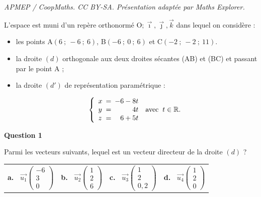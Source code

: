 \documentclass[10pt]{article}
\providecommand{\R}{\mathbb{R}}
\providecommand{\vect}[1]{\overrightarrow{#1}}
\providecommand{\Oijk}{\(\mathrm{O};\vec{\imath},\vec{\jmath},\vec{k}\)}
\begin{document}
\noindent\textit{APMEP / CoopMaths. CC BY-SA. Présentation adaptée par Maths Explorer.}\par\medskip
\medskip





L'espace est muni d'un repère orthonormé \Oijk{} dans lequel on considère :

\begin{itemize}
\item[$\bullet$~~] les points A$(6~;~-6~;~6)$, B$(-6~;~0~;~6)$ et C$(-2~;~-2~;~11)$.
\item[$\bullet$~~] la droite $(d)$ orthogonale aux deux droites sécantes (AB) et (BC) et passant par le point A ;
\item[$\bullet$~~] la droite $\left(d'\right)$ de représentation paramétrique :

\[\left\{\begin{array}{l !{=} r l}
x &  -6 - 8t\\
y & 4t & \text{avec }\:t \in \R.\\
z &  6 + 5t
\end{array}\right.\]
\end{itemize}

\medskip

\textbf{Question 1}

Parmi les vecteurs suivants, lequel est un vecteur directeur de la droite $(d)$ ?

\begin{center}
\begin{tabularx}{\linewidth}{*{4}{X}}
\textbf{a.~} $\vect{u_1}\begin{pmatrix}-6\\3\\0\end{pmatrix}$&
\textbf{b.~} $\vect{u_2}\begin{pmatrix}1\\2\\6\end{pmatrix}$&
\textbf{c.~} $\vect{u_3}\begin{pmatrix}1\\2\\0,2\end{pmatrix}$&
\textbf{d.~} $\vect{u_4}\begin{pmatrix}1\\2\\0\end{pmatrix}$
\end{tabularx}
\end{center}
\end{document}
